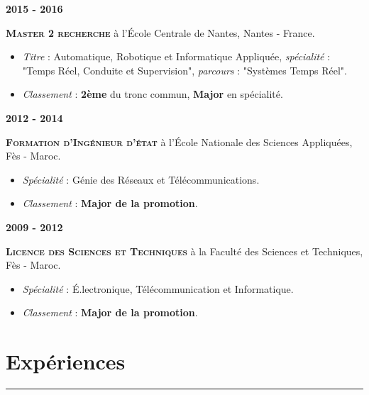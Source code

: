 


\hspace{-0.7cm}\textbf{2015 - 2016}

		\textbf{\textsc{Master 2 recherche}} à l'\'{E}cole Centrale de Nantes, Nantes - France.
		\begin{itemize}[label=-]
			\itemsep-0em 
			\item \textit{Titre }: Automatique, Robotique et Informatique Appliquée, \textit{spécialité} : "Temps Réel, Conduite et Supervision", \textit{parcours} : "Systèmes Temps Réel".
			
			\item \textit{Classement }: \textbf{2ème}  du tronc commun, \textbf{Major} en spécialité. 
		\end{itemize}


\hspace{-0.7cm}\textbf{2012 - 2014}

		\textbf{\textsc{Formation d'Ingénieur d'état}} à l'\'{E}cole Nationale des Sciences Appliquées, Fès - Maroc.
		\begin{itemize}[label=-]
			\itemsep0em 
			\item \textit{Spécialité }: Génie des Réseaux et Télécommunications.
			
			\item \textit{Classement }: \textbf{Major de la promotion}.
		\end{itemize}


\hspace{-0.7cm}\textbf{2009 - 2012}

		\textbf{\textsc{Licence des Sciences et Techniques}} à la Faculté des Sciences et Techniques, Fès - Maroc.
		\begin{itemize}[label=-]
			\itemsep0em 
			\item \textit{Spécialité }: \'{E}.lectronique, Télécommunication et Informatique.
			
			\item \textit{Classement }: \textbf{Major de la promotion}.
		\end{itemize}


\section{Expériences}
\vspace{-0.6cm}
\hspace{0.7cm}\textcolor{myblue}{\rule{15cm}{1mm}}

